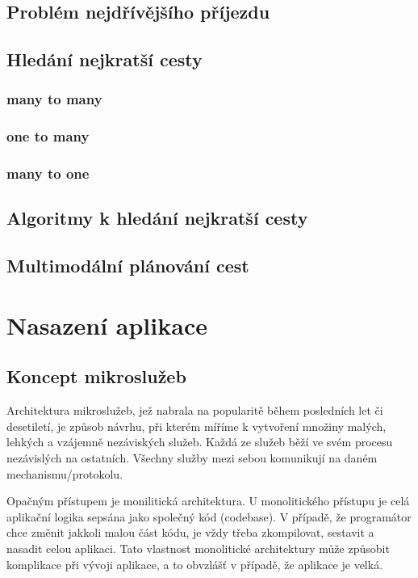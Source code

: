 \documentclass[thesis=M,czech]{FITthesis}[2019/12/23]
\theoremstyle{plain}
\theoremstyle{definition}
\begin{document}
\subsection{Problém nejdřívějšího příjezdu}


\subsection{Hledání nejkratší cesty}

\subsubsection{many to many}

\subsubsection{one to many}

\subsubsection{many to one}


\subsection{Algoritmy k hledání nejkratší cesty}



\subsection{Multimodální plánování cest}


\section{Nasazení aplikace}


\subsection{Koncept mikroslužeb}

Architektura mikroslužeb, jež nabrala na popularitě během posledních let či desetiletí, je způsob návrhu, při kterém míříme k vytvoření množiny malých, lehkých a vzájemně nezáviských služeb. Každá ze služeb běží ve svém procesu nezávislých na ostatních. Všechny služby mezi sebou komunikují na daném mechanismu/protokolu.

Opačným přístupem je monilitická architektura. U monolitického přístupu je celá aplikační logika sepsána jako společný kód (codebase). V případě, že programátor chce změnit jakkoli malou část kódu, je vždy třeba zkompilovat, sestavit a nasadit celou aplikaci. Tato vlastnost monolitické architektury může způsobit komplikace při vývoji aplikace, a to obvzlášť v případě, že aplikace je velká.
\end{document}
